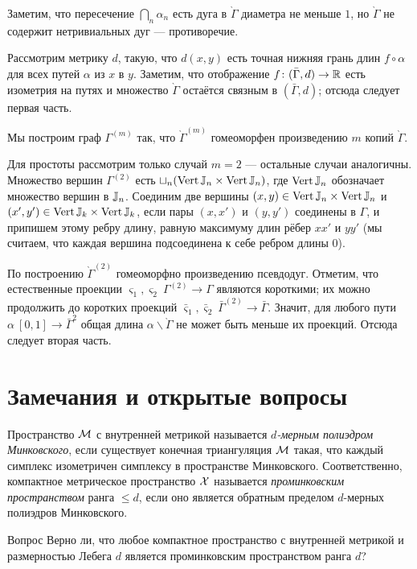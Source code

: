 \documentclass[oneside,a4paper]{article}
\begin{document}
Заметим, что пересечение $\bigcap_n\alpha_n$ есть дуга в $\grave\Gamma$ диаметра не меньше $1$, но $\grave\Gamma$ не содержит нетривиальных дуг --- противоречие.

Рассмотрим метрику $d$, такую, что $d(x,y)$ есть точная нижняя грань длин $f\circ\alpha$ для всех путей $\alpha$ из $x$ в $y$.
Заметим, что отображение $f\colon(\bar\Gamma,d)\to\mathbb{R}$ есть изометрия на путях и множество $\grave\Gamma$ остаётся связным в $(\bar\Gamma,d)$; отсюда следует первая часть.

Мы построим граф $\Gamma^{(m)}$ так, что $\grave\Gamma^{(m)}$  гомеоморфен произведению $m$ копий $\grave\Gamma$.

Для простоты рассмотрим только случай $m=2$ --- остальные случаи аналогичны.
Множество вершин $\Gamma^{(2)}$ есть $\sqcup_n (\mathop{\rm Vert}\mathbb{J}_n\times \mathop{\rm Vert}\mathbb{J}_n)$, 
где $\mathop{\rm Vert}\mathbb{J}_n$ обозначает множество вершин в $\mathbb{J}_n$.
Соединим две вершины $(x,y)\in \mathop{\rm Vert}\mathbb{J}_n\times \mathop{\rm Vert}\mathbb{J}_n$ и $(x',y')\in \mathop{\rm Vert}\mathbb{J}_k\times \mathop{\rm Vert}\mathbb{J}_k$, если пары $(x,x')$ и $(y,y')$ соединены в $\Gamma$, и припишем этому ребру длину, равную максимуму длин рёбер   $x x'$ и $y y'$ (мы считаем, что каждая вершина подсоединена к себе ребром длины $0$).

По построению $\grave\Gamma^{(2)}$ гомеоморфно произведению псевдодуг.
Отметим, что естественные проекции $\varsigma_1,\varsigma_2\:\Gamma^{(2)}\to\Gamma$ являются короткими;
их можно продолжить до коротких проекций $\bar\varsigma_1,\bar\varsigma_2\:\bar\Gamma^{(2)}\to\bar\Gamma$.
Значит, для любого пути $\alpha\:[0,1]\to\bar\Gamma^2$ 
общая длина $\alpha\backslash\grave\Gamma$ не может быть меньше их проекций.
Отсюда следует вторая часть.
\qeds



\section{Замечания и открытые вопросы}

Пространство $\mathcal{M}$ с внутренней метрикой называется \emph{$d$-мерным полиэдром Минковского},
если существует конечная триангуляция $\mathcal{M}$ такая, что каждый симплекс изометричен симплексу в пространстве Минковского.
Соответственно, компактное метрическое пространство $\mathcal{X}$
 называется \emph{проминковским пространством} ранга $\le d$, 
если оно является обратным пределом $d$-мерных полиэдров Минковского.

\begin{thm}{Вопрос}
Верно ли, что любое компактное пространство с внутренней метрикой и размерностью Лебега $d$ является проминковским пространством ранга $d$? 
\end{thm}
\end{document}
